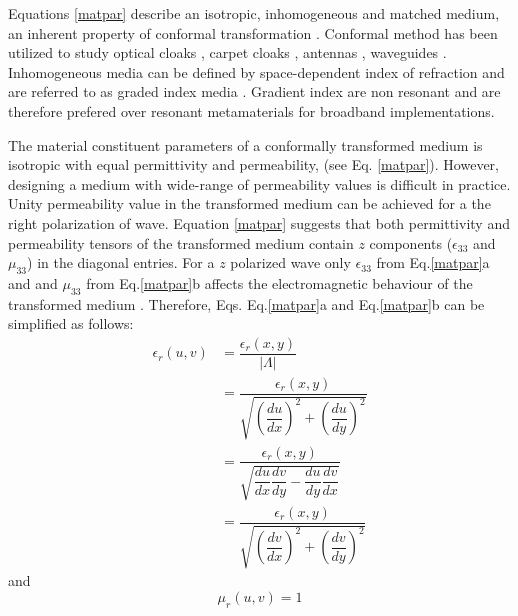 %
Equations \ref{matpar} describe an isotropic, inhomogeneous and matched medium, an inherent property of conformal transformation \cite{Leonhardt2009}. Conformal method has been utilized to study optical cloaks \cite{Urzhumov2010}, carpet cloaks \cite{Schmied2010}, antennas \cite{Leonhardt2008}, waveguides \cite{Ma2010}. Inhomogeneous media can be defined by space-dependent index of refraction and are referred to as graded index media \cite{Gomez-Reino1987}. Gradient index are non resonant and are therefore prefered over resonant metamaterials for broadband implementations.


The material constituent parameters of a conformally transformed medium is isotropic with equal permittivity and permeability, (see Eq. \ref{matpar}). However, designing a medium with wide-range of permeability values is difficult in practice. Unity permeability value in the transformed medium can be achieved for a the right polarization of wave. Equation \ref{matpar} suggests that both permittivity and permeability tensors of the transformed medium contain $z$ components ($\epsilon_{33}$ and $\mu_{33}$) in the diagonal entries. For a $z$ polarized wave only $\epsilon_{33}$ from Eq.\ref{matpar}a and and $\mu_{33}$ from Eq.\ref{matpar}b affects the electromagnetic behaviour of the transformed medium \cite{zouhdi2012}\cite{Leonhardt2009}. Therefore, Eqs. Eq.\ref{matpar}a and Eq.\ref{matpar}b can be simplified as follows:
%
\begin{subequations} \label{eq:eps}
	\begin{align}
		\epsilon_r(u,v) &=\dfrac{\epsilon_r(x,y)}{|\Lambda|} \\
                         &=\dfrac{\epsilon_r(x,y)}{\sqrt{\left(  \dfrac{du}{dx}\right )^{2}+\left(\dfrac{du}{dy}\right )^{2}}} \\
		&=\dfrac{\epsilon_r(x,y)}{\sqrt{\dfrac{du}{dx}\dfrac{dv}{dy}-\dfrac{du}{dy}\dfrac{dv}{dx}}} \\
		&=\dfrac{\epsilon_r(x,y)}{\sqrt{\left(\dfrac{dv}{dx}\right )^{2}+\left(\dfrac{dv}{dy}\right )^{2}}} \label{eq:transconda}
	\end{align}
\end{subequations}
%
and
%
\begin{equation} \label{eq:transcondb}
	\mu_r(u,v) = 1
\end{equation}
%

